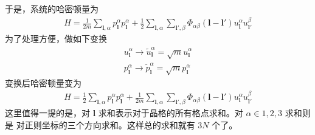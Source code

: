 \par 于是，系统的哈密顿量为
\begin{equation}
    \begin{aligned} 
    H = \frac{1}{2m}\sum_{\mathbf{l},\alpha}p_\mathbf{l}^\alpha  p_\mathbf{l}^\alpha   + 
    \frac{1}{2}\sum_{\mathbf{l},\alpha }\sum_{\mathbf{l'},\beta } \Phi_{\alpha \beta} 
    (\mathbf{l-l'} )u_\mathbf{l}^\alpha u_\mathbf{l'}^\beta 
    \end{aligned} 
\end{equation}
为了处理方便，做如下变换
\begin{equation}
    \begin{aligned} 
    u_\mathbf{l}^\alpha \rightarrow \tilde{u}_\mathbf{l}^\alpha = \sqrt{m} u_\mathbf{l}^\alpha \\
    p_\mathbf{l}^\alpha \rightarrow \tilde{p}_\mathbf{l}^\alpha = \sqrt{m} p_\mathbf{l}^\alpha
    \end{aligned} 
\end{equation}
变换后哈密顿量变为
\begin{equation}
    \begin{aligned} 
        H = \frac{1}{2}\sum_{\mathbf{l},\alpha}p_\mathbf{l}^\alpha  p_\mathbf{l}^\alpha   + 
    \frac{1}{2m}\sum_{\mathbf{l},\alpha }\sum_{\mathbf{l'},\beta } \Phi_{\alpha \beta} 
    (\mathbf{l-l'} )u_\mathbf{l}^\alpha u_\mathbf{l'}^\beta 
    \label{chap1-1}
    \end{aligned} 
\end{equation}
这里值得一提的是，对 $ \mathbf{l}  $ 求和表示对于晶格的所有格点求和。对 $ \alpha \in {1,2,3} $ 求和则是
对正则坐标的三个方向求和。这样总的求和就有 $ 3N $ 个了。

